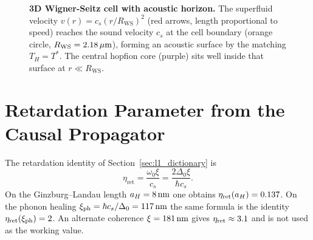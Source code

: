 \documentclass[11pt,letterpaper]{article}
\begin{document}
\begin{figure}[htbp]
\centering
{}
\caption{\textbf{3D Wigner-Seitz cell with acoustic horizon.} The superfluid velocity $v(r) = c_s(r/R_{\text{WS}})^2$ (red arrows, length proportional to speed) reaches the sound velocity $c_s$ at the cell boundary (orange circle, $R_{\text{WS}} =2.18\,\mu\mathrm{m}$), forming an acoustic surface by the matching $T_H=T^*$. The central hopfion core (purple) sits well inside that surface at $r \ll R_{\mathrm{WS}}$.}
\label{fig:ws_horizon_3d}
\end{figure}

\section{Retardation Parameter from the Causal Propagator}
\label{sec:retardation_correction}

The retardation identity of Section~\ref{sec:l1_dictionary} is
\begin{equation}
\eta_{\text{ret}} = \frac{\omega_0 \xi}{c_s} = \frac{2\Delta_0 \xi}{\hbar c_s}.
\end{equation}
On the Ginzburg--Landau length $a_H=8\,\mathrm{nm}$ one obtains $\eta_{\mathrm{ret}}(a_H)=0.137$. On the phonon healing $\xi_{\mathrm{ph}}=\hbar c_s/\Delta_0=117\,\mathrm{nm}$ the same formula is the identity $\eta_{\mathrm{ret}}(\xi_{\mathrm{ph}})=2$. An alternate coherence $\xi=181\,\mathrm{nm}$ gives $\eta_{\mathrm{ret}}\approx3.1$ and is not used as the working value.
\end{document}
